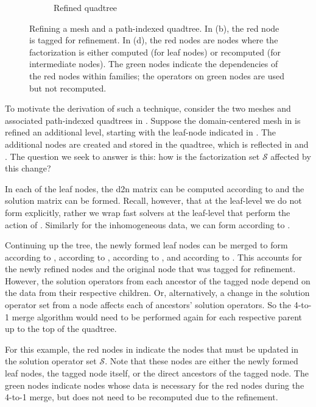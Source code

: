 \begin{figure}[t]
\begin{subfigure}[t]{0.55\textwidth}
        \caption{Refined quadtree}
        \label{fig:adaptive-tree-rebuild-01}
    \end{subfigure}
    \caption{Refining a mesh and a path-indexed quadtree. In (b), the red node is tagged for refinement. In (d), the red nodes are nodes where the factorization is either computed (for leaf nodes) or recomputed (for intermediate nodes). The green nodes indicate the dependencies of the red nodes within families; the operators on green nodes are used but not recomputed.}
    \label{fig:adaptive-mesh-rebuild}
\end{figure}

To motivate the derivation of such a technique, consider the two meshes and associated path-indexed quadtrees in . Suppose the domain-centered mesh in  is refined an additional level, starting with the leaf-node indicated in . The additional nodes are created and stored in the quadtree, which is reflected in  and . The question we seek to answer is this: how is the factorization set $\mathcal{S}$ affected by this change?

In each of the leaf nodes, the \gls{d2n} matrix \Ttau can be computed according to  and the solution matrix \Stau can be formed. Recall, however, that at the leaf-level we do not form \Stau explicitly, rather we wrap fast solvers at the leaf-level that perform the action of \Stau. Similarly for the inhomogeneous data, we can form \htau according to .

Continuing up the tree, the newly formed leaf nodes can be merged to form \Ttau according to , \Stau according to , \htau according to , and \wtau according to . This accounts for the newly refined nodes and the original node that was tagged for refinement. However, the solution operators from each ancestor of the tagged node depend on the data from their respective children. Or, alternatively, a change in the solution operator set from a node affects each of ancestors' solution operators. So the 4-to-1 merge algorithm would need to be performed again for each respective parent up to the top of the quadtree.

For this example, the red nodes in  indicate the nodes that must be updated in the solution operator set $\mathcal{S}$. Note that these nodes are either the newly formed leaf nodes, the tagged node itself, or the direct ancestors of the tagged node. The green nodes indicate nodes whose data is necessary for the red nodes during the 4-to-1 merge, but does not need to be recomputed due to the refinement.

